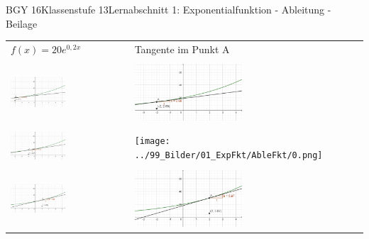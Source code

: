 \documentclass[oneside,openany,headings=optiontotoc,11pt,numbers=noenddot]{scrreprt}
\begin{document}
	\begin{worksheet}{BGY 16}{Klassenstufe 13}{Lernabschnitt 1: Exponentialfunktion - Ableitung - Beilage}
		\setcounter{page}{3}
		\begin{framed}
			\noindent
			\begin{tabularx}{\textwidth}{X|X}
				\multicolumn{1}{X}{\(f(x) = 20e^{0,2x}\)} & \multicolumn{1}{X}{Tangente im Punkt A}\\
				\multicolumn{1}{X}{} & \multicolumn{1}{X}{}\\
				\includegraphics[width=0.48\textwidth]{../99_Bilder/01_ExpFkt/AbleFkt/-3.png} & \includegraphics[width=0.48\textwidth]{../99_Bilder/01_ExpFkt/AbleFkt/-2.png}\\
				\\
				\includegraphics[width=0.48\textwidth]{../99_Bilder/01_ExpFkt/AbleFkt/-1.png} & \texttt{[image: ../99\_Bilder/01\_ExpFkt/AbleFkt/0.png]}\\
				\\
				\includegraphics[width=0.48\textwidth]{../99_Bilder/01_ExpFkt/AbleFkt/1.png} & \includegraphics[width=0.48\textwidth]{../99_Bilder/01_ExpFkt/AbleFkt/2.png}\\

\end{tabularx}
\end{framed}
\end{worksheet}
\end{document}
